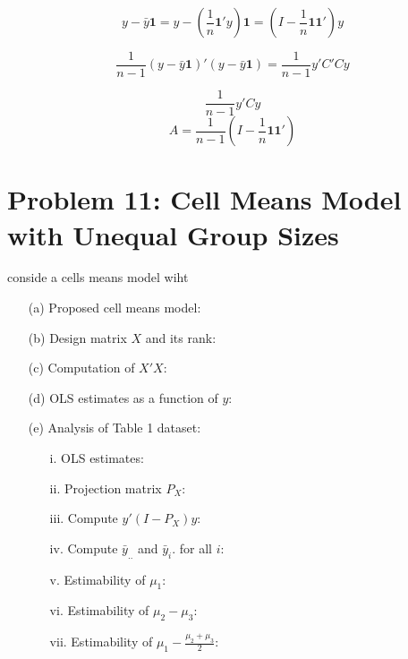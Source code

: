 \documentclass[10pt, oneside]{article}
\begin{document}
\[
y - \bar{y}\mathbf{1} = y - \left( \frac{1}{n} \mathbf{1}'y \right)\mathbf{1} = \left( I - \frac{1}{n} \mathbf{1}\mathbf{1}' \right)y
\]

\[
\frac{1}{n-1} (y - \bar{y}\mathbf{1})'(y - \bar{y}\mathbf{1}) = \frac{1}{n-1} y' C'C y
\]

\[
\frac{1}{n-1} y' C y
\]
\[
A = \frac{1}{n-1} \left( I - \frac{1}{n} \mathbf{1}\mathbf{1}' \right)
\]

\section*{Problem 11: Cell Means Model with Unequal Group Sizes}
conside a cells means model wiht 
\begin{itemize}
	\item[(a)] Proposed cell means model:
	\item[(b)] Design matrix $X$ and its rank:
	\item[(c)] Computation of $X'X$:
	\item[(d)] OLS estimates as a function of $y$:
	\item[(e)] Analysis of Table 1 dataset:
	\begin{itemize}
		\item[i.] OLS estimates:
		\item[ii.] Projection matrix $P_X$:
		\item[iii.] Compute $y'(I - P_X)y$:
		\item[iv.] Compute $\bar{y}_{..}$ and $\bar{y}_i.$ for all $i$:
		\item[v.] Estimability of $\mu_1$:
		\item[vi.] Estimability of $\mu_2 - \mu_3$:
		\item[vii.] Estimability of $\mu_1 - \frac{\mu_2 + \mu_3}{2}$:
	\end{itemize}
\end{itemize}
\end{document}
